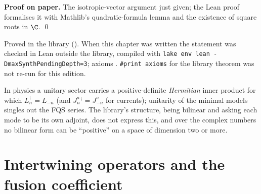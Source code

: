 \textbf{Proof on paper.} The isotropic-vector argument just given; the Lean proof formalises it with Mathlib's
quadratic-formula lemma  and the existence of square roots in $\C$. \qed

\begin{status}
Proved in the library (). When this chapter was written the statement was checked in Lean
outside the library, compiled with \texttt{lake env lean -DmaxSynthPendingDepth=3}; axioms . \texttt{\#print axioms} for the library theorem was not re-run for this edition.
\end{status}

\begin{physics}
In physics a unitary sector carries a positive-definite \emph{Hermitian} inner product for which $L_n^\dagger = L_{-n}$
(and $J^a_n{}^\dagger = J^a_{-n}$ for currents); unitarity of the minimal models singles out the FQS series. The library's
structure, being bilinear and asking each mode to be its own adjoint, does not express this, and over the complex
numbers no bilinear form can be ``positive'' on a space of dimension two or more.
\end{physics}

\section{Intertwining operators and the fusion coefficient}\label{l12:sec:fusion}

